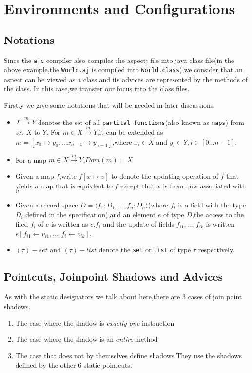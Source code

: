 \section{Environments and Configurations}

\subsection{Notations}
Since the \texttt{ajc} compiler also compiles the aspectj file into java class file(in the above example,the \texttt{World.aj} is compiled into \texttt{World.class}),we consider that an aspect can be viewed as a class and its advices are represented by the methods of the class. In this case,we transfer our focus into the class files.

Firstly we give some notations that will be needed in later discussions.
\begin{itemize}
  \item $X\xrightarrow{m}{Y}$ denotes the set of all \texttt{partital functions}(also known as \texttt{maps}) from set $X$ to $Y$. For $m\in X\xrightarrow{m}{Y}$,it can be extended as $m=[x_0\mapsto y_0,\ldots x_{n-1}\mapsto y_{n-1}]$,where $x_i\in X$ and $y_i\in Y,i\in[0\ldots n-1]$.
  \item For a map $m\in X\xrightarrow{m}{Y}$,$Dom(m)=X$
  \item Given a map $f$,write $f[x\mapsto v]$ to denote the updating operation of $f$ that yields a map that is equivlent to $f$ except that $x$ is from now associated with $v$
  \item Given a record space $D=\langle f_1:D_1,\ldots,f_n:D_n\rangle$(where $f_i$ is a field with the type $D_i$ defined in the specification),and an element $e$ of type $D$,the access to the filed $f_i$ of $e$ is written as $e.f_i$ and the update of fields $f_{i1},\ldots,f_{ik}$ is written $e[f_{i1}\leftarrow v_{i1},\ldots,f_{i}\leftarrow v_{ik}]$.
  \item $(\tau)-set$ and $(\tau)-list$ denote the \texttt{set} or \texttt{list} of type $\tau$ respectively.
\end{itemize}

\subsection{Pointcuts, Joinpoint Shadows and Advices}
As with the static designators we talk about here,there are 3 cases of join point shadows.
\begin{enumerate}
  \item The case where the shadow is \textsl{exactly one} instruction
  \item The case where the shadow is an \textsl{entire} method
  \item The case that does not by themselves define shadows.They use the shadows defined by the other 6 static pointcuts.
\end{enumerate}


